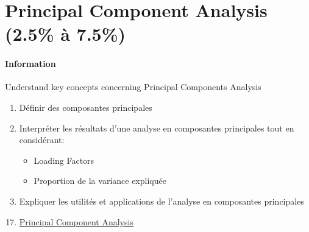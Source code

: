 \documentclass[12pt, titlepage, french]{report}
\begin{document}
\newpage
\chapter[Principal Component Analysis]{Principal Component Analysis (2.5\% à 7.5\%)}

\subsubsection{Information}

\begin{distributions}[Objective]
Understand key concepts concerning Principal Components Analysis
\end{distributions}

\begin{outcomes}
\begin{enumerate}
	\item	Définir des composantes principales
	\item	Interpréter les résultats d'une analyse en composantes principales tout en considérant:
	\begin{itemize}
		\item	\og Loading Factors \fg{} 
		\item	Proportion de la variance expliquée
	\end{itemize}
	\item	Expliquer les utilités et applications de l'analyse en composantes principales
\end{enumerate}
\end{outcomes}

\begin{ASM_chapter}
\begin{enumerate}
  \setcounter{enumi}{16}
	\item	\hyperref[PCA-KNN]{Principal Component Analysis}
\end{enumerate}
\end{ASM_chapter}
\end{document}
